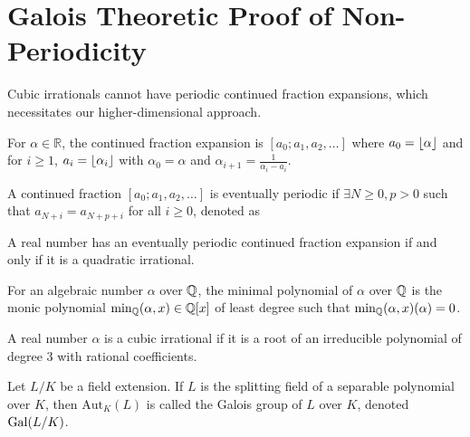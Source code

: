 \section{Galois Theoretic Proof of Non-Periodicity}\label{sec:galois_theory}

Cubic irrationals cannot have periodic continued fraction expansions, which necessitates our higher-dimensional approach.

\begin{definition}
For $\alpha \in \mathbb{R}$, the continued fraction expansion is $[a_0; a_1, a_2, \ldots]$ where $a_0 = \lfloor \alpha \rfloor$ and for $i \geq 1$, $a_i = \lfloor \alpha_i \rfloor$ with $\alpha_0 = \alpha$ and $\alpha_{i+1} = \frac{1}{\alpha_i - a_i}$.
\end{definition}

\begin{definition}
A continued fraction $[a_0; a_1, a_2, \ldots]$ is eventually periodic if $\exists N \geq 0, p > 0$ such that $a_{N+i} = a_{N+p+i}$ for all $i \geq 0$, denoted as 
\begin{equation}
[a_0; a_1, \ldots, a_{N-1}, \overline{a_N, \ldots, a_{N+p-1}}]
\end{equation}
\end{definition}

\begin{theorem}[Lagrange]\label{thm:lagrange}
A real number has an eventually periodic continued fraction expansion if and only if it is a quadratic irrational.
\end{theorem}

\begin{definition}
For an algebraic number $\alpha$ over $\mathbb{Q}$, the minimal polynomial of $\alpha$ over $\mathbb{Q}$ is the monic polynomial $\text{min}_{\mathbb{Q}}(\alpha, x) \in \mathbb{Q}[x]$ of least degree such that $\text{min}_{\mathbb{Q}}(\alpha, x)(\alpha) = 0$.
\end{definition}

\begin{definition}
A real number $\alpha$ is a cubic irrational if it is a root of an irreducible polynomial of degree 3 with rational coefficients.
\end{definition}

\begin{definition}
Let $L/K$ be a field extension. If $L$ is the splitting field of a 
separable polynomial over $K$, then $\text{Aut}_K(L)$ is called the Galois group 
of $L$ over $K$, denoted $\operatorname{Gal}(L/K)$.
\end{definition}


